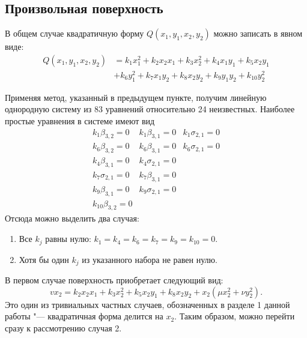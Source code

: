\documentclass[../main.tex]{subfiles}
\begin{document}
\subsection{Произвольная поверхность}
В общем случае квадратичную форму $Q(x_1, y_1, x_2, y_2)$ можно записать в явном виде:
\begin{align*}
Q(x_1, y_1, x_2, y_2) &= k_1 x_1^2 + k_2 x_2 x_1 + k_3 x_2^2 + k_4 x_1 y_1 + k_5 x_2 y_1 \\
&+ k_6 y_1^2 + k_7 x_1 y_2 + k_8 x_2 y_2 + k_9 y_1 y_2 + k_{10} y_2^2
\end{align*}

Применяя метод, указанный в предыдущем пункте, получим линейную однородную систему из 83 уравнений относительно 24 неизвестных. Наиболее простые уравнения в системе имеют вид
\begin{equation}
\begin{matrix}
 k_1 \beta _{3,2}=0 &  k_1 \beta _{3,1}=0 &  k_1 \sigma _{2,1}=0 \\
 k_6 \beta _{3,2}=0 & k_6 \beta _{3,1}=0 & k_6 \sigma _{2,1}=0 \\
 k_4 \beta _{3,1}=0 &  k_4 \sigma _{2,1}=0 \\
 k_7 \sigma _{2,1}=0 & k_7 \beta _{3,1}=0 \\
 k_9 \beta _{3,1}=0 & k_9 \sigma _{2,1}=0 \\
 k_{10} \beta _{3,2}=0 &  & 
\end{matrix}
\end{equation}
Отсюда можно выделить два случая:
\begin{enumerate}
	\item Все $k_j$ равны нулю: $k_1 = k_4 = k_6 = k_7 = k_9 = k_{10} = 0$.
	\item Хотя бы один $k_j$ из указанного набора не равен нулю.
\end{enumerate}
В первом случае поверхность приобретает следующий вид:
\begin{equation*}
v x_2 = k_2 x_2 x_1 + k_3 x_2^2 + k_5 x_2 y_1 + k_8 x_2 y_2 + x_2 (\mu x_2^2 + \nu y_2^2).
\end{equation*}
Это один из тривиальных частных случаев, обозначенных в разделе 1 данной работы "--- квадратичная форма делится на $x_2$. Таким образом, можно перейти сразу к рассмотрению случая 2.
\end{document}
